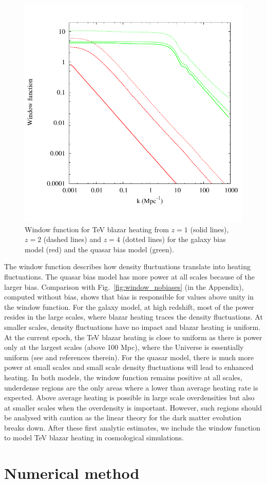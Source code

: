 \documentclass[twocolumns]{emulateapj}
\begin{document}
\begin{figure}[h]
  \centering
  \includegraphics[width = .45\textwidth ]{window_gal_qso-eps-converted-to}
  \caption{Window function for TeV blazar heating from $z=1$ (solid lines), $z=2$ (dashed lines) and $z=4$ (dotted lines) for the galaxy bias model (red) and the quasar bias model (green).}
  \label{fig:window}
\end{figure}

The window function describes how density fluctuations translate into heating fluctuations. The quasar  bias model has more power at all scales because of the larger bias. Comparison with Fig.~\ref{fig:window_nobiases} (in the Appendix), computed without bias, shows that bias is responsible for values above unity in the window function. For the galaxy model, at high redshift, most of the power resides in the large scales, where blazar heating traces the density fluctuations. At smaller scales, density fluctuations have no impact and blazar heating is uniform. At the current epoch,  the TeV blazar heating is close to uniform as there is power only at the largest scales (above 100 Mpc), where the Universe is essentially uniform  (see \citet{2013MNRAS.429.2910C} and references therein). For the quasar model, there is much more power at small scales and small scale density fluctuations will lead to enhanced heating. In both models, the window function remains positive at all scales, underdense regions are the only areas where a lower than average heating rate is expected. Above average  heating is possible in large scale overdensities but also at  smaller scales when the overdensity is important.  However, such regions should be analysed with caution as the linear theory for the dark matter evolution breaks down. After these first analytic estimates, we include the window function to model TeV blazar heating in cosmological simulations. 


\section{Numerical method}
\end{document}
